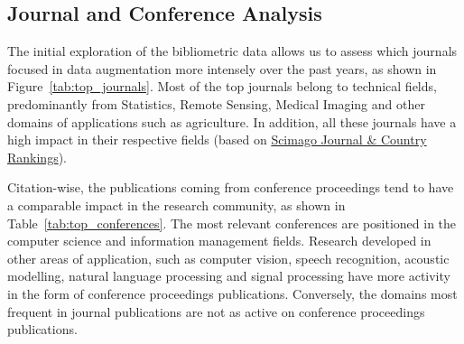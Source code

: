 \documentclass[parskip=full]{scrartcl}
\begin{document}

\subsection{Journal and Conference Analysis}

The initial exploration of the bibliometric data allows us to assess which
journals focused in data augmentation more intensely over the past years, as
shown in Figure~\ref{tab:top_journals}. Most of the top journals belong to
technical fields, predominantly from Statistics, Remote Sensing, Medical
Imaging and other domains of applications such as agriculture. In addition,
all these journals have a high impact in their respective fields (based on 
\href{https://www.scimagojr.com/}{Scimago Journal \& Country Rankings}).   

\begin{table}[H]
    \centering
    \vspace{.2cm}
    \caption{\label{tab:top_journals}
        Top journals focusing on data augmentation techniques, sorted by
        citations per document.
    }
\end{table}

Citation-wise, the publications coming from conference proceedings tend to
have a comparable impact in the research community, as shown in
Table~\ref{tab:top_conferences}. The most relevant conferences are positioned
in the computer science and information management fields. Research developed
in other areas of application, such as computer vision, speech recognition,
acoustic modelling, natural language processing and signal processing have
more activity in the form of conference proceedings publications. Conversely,
the domains most frequent in journal publications are not as active on
conference proceedings publications.
\end{document}
